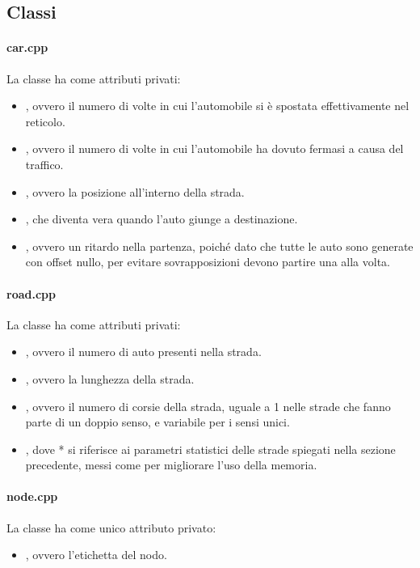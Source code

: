 \documentclass[main.tex]{subfiles}
\begin{document}
    \subsection{Classi}
        \paragraph{car.cpp}
            La classe  ha come attributi privati:
            \begin{itemize}
                \item {}, ovvero il numero di volte in cui l'automobile si è spostata effettivamente nel reticolo.
                \item {}, ovvero il numero di volte in cui l'automobile ha dovuto fermasi a causa del traffico.
                \item {}, ovvero la posizione all'interno della strada.
                \item {}, che diventa vera quando l'auto giunge a destinazione.
                \item {}, ovvero un ritardo nella partenza, poiché dato che tutte le auto
                    sono generate con offset nullo, per evitare sovrapposizioni devono partire una alla volta.
            \end{itemize}
        \paragraph{road.cpp}
            La classe  ha come attributi privati:
            \begin{itemize}
                \item {}, ovvero il numero di auto presenti nella strada.
                \item {}, ovvero la lunghezza della strada.
                \item {}, ovvero il numero di corsie della strada, uguale a 1 nelle strade che fanno parte di un doppio senso,
                    e variabile per i sensi unici.
                \item {}, dove * si riferisce ai parametri statistici delle strade spiegati nella sezione precedente, messi come
                     per migliorare l'uso della memoria.
            \end{itemize}
        \paragraph{node.cpp}
            La classe  ha come unico attributo privato:
            \begin{itemize}
                \item {}, ovvero l'etichetta del nodo.
            \end{itemize}
\end{document}
